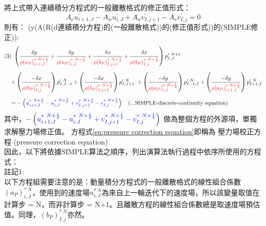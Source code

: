 \documentclass[12pt]{article}
\theoremstyle{upright}
\begin{document}
將上式帶入連續積分方程式的一般離散格式的修正值形式：
\begin{equation}A_{e}u_{i+1,J}^{\prime} - A_{w}u_{i,J}^{\prime}+A_{n}v_{I,j+1}^{\prime} - A_{s}v_{I,j}^{\prime} = 0 \end{equation}
\noindent 則有：
\noindent (y(A(R(d連續積分方程)的(一般離散格式))的(修正值形式))的(SIMPLE修正)):
\begin{equation}\label{eq:pressure correction equation}\begin{aligned}
     &(3)\  \left(\frac{\delta y}{{\color{red}\rho(a_{P})_{i+1,J}^{*\ N+\frac{1}{2}}}}+
        \frac{\delta y}{{\color{red}\rho(a_{P})_{i,J}^{*\ N+\frac{1}{2}}}}+
        \frac{\delta x}{{\color{red}\rho(b_{P})_{I,j+1}^{*\ N+\frac{1}{2}}}}+
        \frac{\delta x}{{\color{red}\rho(b_{P})_{I,j}^{*\ N+\frac{1}{2}}}}\right)p_{I,J}^{\prime\ N+1}\\[1.5ex]
    &\quad  +
        \left(\frac{-\delta x}{{\color{red}\rho(b_{P})_{I,j}^{*\ N+\frac{1}{2}}}}\right)p_{I,J-1}^{\prime\ N} + 
        \left(\frac{-\delta x}{{\color{red}\rho(b_{P})_{I,j+1}^{*\ N+\frac{1}{2}}}}\right)p_{I,J+1}^{\prime\ N} \ + 
        \left(\frac{-\delta y}{{\color{red}\rho(a_{P})_{i,J}^{*\ N+\frac{1}{2}}}}\right)p_{I-1,J}^{\prime\ N} + 
        \left(\frac{-\delta y}{{\color{red}\rho(a_{P})_{i+1,J}^{*\ N+\frac{1}{2}}}}\right)p_{I+1,J}^{\prime\ N} \\[1.5ex]
    &\quad = - \left( {\color{blue}u_{i+1,J}^{*\ N+\frac{1}{2}} - u_{i,J}^{*\ N+\frac{1}{2}} + v_{I,j+1}^{*\ N+\frac{1}{2}} - v_{I,j}^{*\ N+\frac{1}{2}}} \right) \quad \text{(...SIMPLE-discrete-continuity equation)}
\end{aligned}\end{equation}
其中，$- \left( {\color{blue}u_{i+1,J}^{*\ N+\frac{1}{2}} - u_{i,J}^{*\ N+\frac{1}{2}} + v_{I,j+1}^{*\ N+\frac{1}{2}} - v_{I,j}^{*\ N+\frac{1}{2}}} \right) $ 做為整個方程的外源項，單獨求解壓力場修正值。
方程式\eqref{eq:pressure correction equation}即稱為 壓力場校正方程
(pressure correction equation) \\
因此，以下將依據SIMPLE算法之順序，列出演算法執行過程中依序所使用的方程式：\\
\newpage
\noindent 註記1: \\
\noindent 以下方程組需要注意的是：動量積分方程式的一般離散格式的線性組合係數$(a_{P})_{i,J}^{*\ N}$，使用到的速度場$u_{i,J}^{*\ N}$為來自上一輪迭代下的速度場，所以該變量取值在計算步 = N，而非計算步 = N+1。且離散方程的線性組合係數總是取速度場預估值。同理，$(b_{P})_{I,j}^{*\ N}$亦然。
\end{document}
